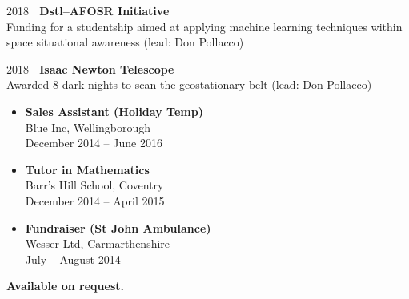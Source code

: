 \justify
\vspace{-1em}
\small 2018 | \textbf{Dstl--AFOSR Initiative} \\
Funding for a studentship aimed at applying machine learning techniques within space situational awareness (lead: Don Pollacco)

\divider

\small 2018 | \textbf{Isaac Newton Telescope} \\
Awarded 8 dark nights to scan the geostationary belt (lead: Don Pollacco)

\medskip


\begin{itemize}
	\item \textbf{Sales Assistant (Holiday Temp)} \\
	Blue Inc, Wellingborough \\
	December 2014 -- June 2016
	\item \textbf{Tutor in Mathematics} \\
	Barr's Hill School, Coventry \\
	December 2014 -- April 2015
	\item \textbf{Fundraiser (St John Ambulance)} \\
	Wesser Ltd, Carmarthenshire \\
	July -- August 2014
\end{itemize}

\medskip


\normalsize \textbf{Available on request.}
